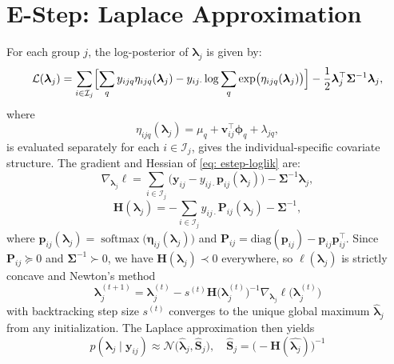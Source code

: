 \documentclass[]{report}
\theoremstyle{definition}
\begin{document}
\section{E-Step: Laplace Approximation}
\label{subsec: E-step}
    For each group $j$, the log-posterior of $\bm{\lambda}_{j}$ is given by:
\begin{equation}
    \mathcal{L}(\bm{\lambda}_{j})=\sum_{i\in \mathcal{I}_{j}}\Bigl[\sum_{q}y_{ijq}\eta_{ijq}(\bm{\lambda}_{j})-y_{ij\cdot}\log \sum_{q}\exp\bigl(\eta_{ijq}(\bm{\lambda}_{j})\bigr)\Bigr]-\frac{1}{2}\bm{\lambda}_{j}^{\top}\bm{\Sigma}^{-1}\bm{\lambda}_{j},
    \label{eq: estep-loglik}
\end{equation}
where 
\begin{equation}
    \eta_{ijq}(\bm{\lambda}_{j})=\mu_{q}+\bm{v}_{ij}^{\top}\bm{\phi}_{q}+\lambda_{jq},
    \label{eq: individualcovariate}
\end{equation}
is evaluated separately for each $i\in \mathcal{I}_{j}$, gives the individual-specific covariate structure.
    The gradient and Hessian of \ref{eq: estep-loglik} are:
    \begin{equation}
        \nabla_{\bm{\lambda}_{j}}\ell=\sum_{i\in \mathcal{I}_{j}}\bigl(\bm{y}_{ij}-y_{ij\cdot}\bm{p}_{ij}(\bm{\lambda}_{j})\bigr)-\bm{\Sigma}^{-1}\bm{\lambda}_{j},
    \end{equation}
    \begin{equation}
        \mathbf{H}(\bm{\lambda}_{j})=-\sum_{i\in\mathcal{I}_{j}}y_{ij\cdot}\mathbf{P}_{ij}(\bm{\lambda}_{j})-\bm{\Sigma}^{-1},
        \label{eq: Hessian1}
    \end{equation}
where $\bm{p}_{ij}(\bm{\lambda}_{j})=\operatorname{softmax}\bigl(\bm{\eta}_{ij}(\bm{\lambda}_{j})\bigr)$ and $\mathbf{P}_{ij}=\text{diag}(\bm{p}_{ij})-\bm{p}_{ij}\bm{p}_{ij}^{\top}$. Since $\mathbf{P}_{ij}\succeq 0$ and $\bm{\Sigma}^{-1}\succ 0$, we have $\mathbf{H}(\bm{\lambda}_{j})\prec 0$ everywhere, so $\ell(\bm{\lambda}_{j})$ is strictly concave and Newton's method
\begin{equation}
    \bm{\lambda}_{j}^{(t+1)}=\bm{\lambda}_{j}^{(t)}-s^{(t)}\mathbf{H}\bigl(\bm{\lambda}_{j}^{(t)}\bigr)^{-1}\nabla_{\bm{\lambda}_{j}}\ell \bigl(\bm{\lambda}_{j}^{(t)}\bigr)
\end{equation}
with backtracking step size $s^{(t)}$ converges to the unique global maximum $\hat{\bm{\lambda}}_{j}$ from any initialization. The Laplace approximation then yields
\begin{equation}
    p(\bm{\lambda}_{j}\mid \bm{y}_{ij}) \approx \mathcal{N}\bigl(\hat{\bm{\lambda}}_{j}, \hat{\mathbf{S}}_{j}\bigr), \quad \hat{\mathbf{S}}_{j}=\bigl(-\mathbf{H}(\hat{\bm{\lambda}_{j}})\bigr)^{-1}
\end{equation}
\end{document}
